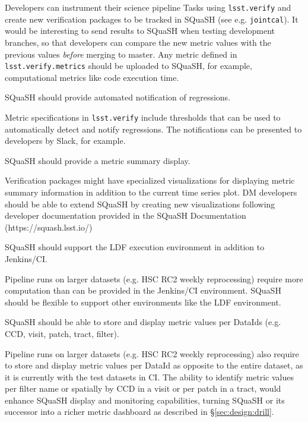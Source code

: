 Developers can instrument their science pipeline Tasks using \texttt{lsst.verify} and create new verification packages to be tracked in SQuaSH (see e.g. \texttt{jointcal}). It would be interesting to send results to SQuaSH when testing development branches, so that developers can compare the new metric values with the previous values \textit{before} merging to master. Any metric defined in \texttt{lsst.verify.metrics} should be uploaded to SQuaSH, for example, computational metrics like code execution time.

\begin{recommendation}
SQuaSH should provide automated notification of regressions.
\end{recommendation}

Metric specifications in \texttt{lsst.verify} include thresholds that can be used to automatically detect and notify regressions. The notifications can be presented to developers by Slack, for example.

\begin{recommendation}
SQuaSH should provide a metric summary display.
\end{recommendation}

Verification packages might have specialized visualizations for displaying metric summary information in addition to the current time series plot. DM developers should be able to extend SQuaSH by creating new visualizations following developer documentation provided in the SQuaSH Documentation (https://squash.lsst.io/)

\begin{recommendation}
SQuaSH should support the LDF execution environment in addition to Jenkins/CI.
\end{recommendation}

Pipeline runs on larger datasets (e.g. HSC RC2 weekly reprocessing) require more computation than can be provided in the Jenkins/CI environment. SQuaSH should be flexible to support other environments like the LDF environment.

\begin{recommendation}
SQuaSH should be able to store and display metric values per DataIds (e.g. CCD, visit, patch, tract, filter).
\end{recommendation}

Pipeline runs on larger datasets (e.g. HSC RC2 weekly reprocessing) also require to store and display metric values per DataId as opposite to the entire dataset, as it is currently with the test datasets in CI. The ability to identify metric values per filter name or spatially by CCD in a visit or per patch in a tract, would enhance SQuaSH display and monitoring capabilities, turning SQuaSH or its successor into a richer metric dashboard as described in \S\ref{sec:design:drill}.


